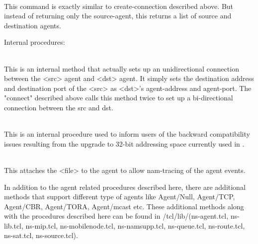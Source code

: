 \begin{flushleft}
\\
This command is exactly similar to create-connection described above. But
instead of returning only the source-agent, this returns a list of source and
destination agents.


Internal procedures:

\\
This is an internal method that actually sets up an unidirectional connection
between the <src> agent and <dst> agent. It simply sets the destination address
and destination port of the <src> as <dst>'s agent-address and agent-port.
The "connect" described above calls this method twice to set up a bi-directional
connection between the src and dst.


\\
This is an internal procedure used to inform users of the backward compatibility
issues resulting from the upgrade to 32-bit addressing space currently used
in \ns.

\\
This attaches the <file> to the agent to allow nam-tracing of the agent
events.


In addition to the agent related procedures described here, there are additional
methods that support different type of agents like Agent/Null, Agent/TCP,
Agent/CBR, Agent/TORA, Agent/mcast etc. These additional methods along with the
procedures described here can be found in \ns/tcl/lib/(ns-agent.tcl,
ns-lib.tcl, ns-mip.tcl, ns-mobilenode.tcl, ns-namsupp.tcl, ns-queue.tcl,
ns-route.tcl, ns-sat.tcl, ns-source.tcl).

\end{flushleft} 

\endinput
